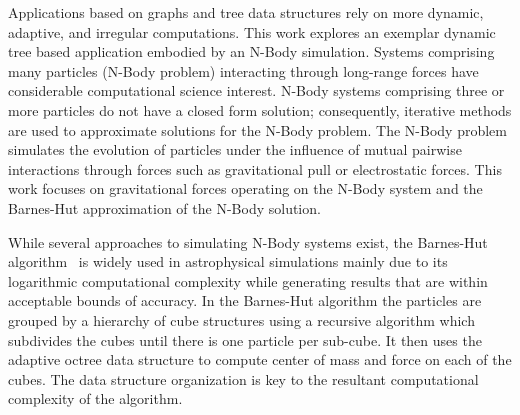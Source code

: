\documentclass[floatfix]{revtex4}
\begin{document}
Applications based on graphs and tree data structures rely on more dynamic, 
adaptive, and irregular computations. This work explores an exemplar dynamic tree 
based application embodied by an N-Body simulation. Systems comprising many particles 
(N-Body problem) interacting through long-range forces have considerable computational
science interest. N-Body systems comprising three or more particles do not have a closed 
form solution; consequently, iterative methods are used to approximate solutions 
for the N-Body problem. The N-Body problem simulates the evolution of  particles 
under the influence of mutual pairwise interactions through forces such as 
gravitational pull or electrostatic forces. This work focuses on gravitational 
forces operating on the N-Body system and the Barnes-Hut approximation of the N-Body solution.

While several approaches to simulating N-Body systems exist, the Barnes-Hut 
algorithm~\cite{barneshut} is widely used in astrophysical simulations 
mainly due to its logarithmic computational complexity while generating results that are 
within acceptable bounds of accuracy. In the Barnes-Hut algorithm the particles
are grouped by a hierarchy of cube structures using a recursive algorithm which subdivides the
cubes until there is one particle per sub-cube. It then uses the adaptive octree
data structure to compute center of mass and force on each of the cubes. The data
structure organization is key to the resultant  computational complexity
of the algorithm.
\end{document}
